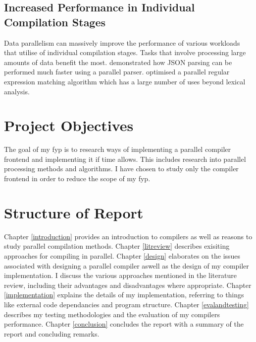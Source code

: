 \subsection{Increased Performance in Individual Compilation Stages}

Data parallelism can massively improve the performance of various workloads that
utilise of individual compilation stages. Tasks that involve processing large
amounts of data benefit the most. \cite{barenghi_parallel_2015} demonstrated
how JSON parsing can be performed much faster using a parallel parser.
\cite{mytkowicz_data-parallel_2014} optimised a parallel regular expression
matching algorithm which has a large number of uses beyond lexical analysis.

\section{Project Objectives}

The goal of my \gls{fyp} is to research ways of implementing a parallel compiler
frontend and implementing it if time allows. This includes research into
parallel processing methods and algorithms. I have chosen to study only the
compiler frontend in order to reduce the scope of my \gls{fyp}.

\section{Structure of Report}

Chapter \ref{introduction} provides an introduction to compilers as well as
reasons to study parallel compilation methods.
\newline \newline
Chapter \ref{litreview} describes exisiting approaches for compiling
in parallel.
\newline \newline
Chapter \ref{design} elaborates on the issues associated with designing a
parallel compiler aswell as the design of my compiler implementation. I discuss
the various approaches mentioned in the literature review, including their
advantages and disadvantages where appropriate.
\newline \newline
Chapter \ref{implementation} explains the details of my implementation,
referring to things like external code dependancies and program structure.
\newline \newline
Chapter \ref{evalandtesting} describes my testing methodologies and the evaluation of my compilers performance.
\newline \newline
Chapter \ref{conclusion} concludes the report with a summary of the report and
concluding remarks.
